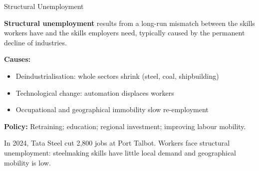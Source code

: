 \documentclass[16pt,aspectratio=169]{beamer}
\begin{document}
\begin{frame}{Structural Unemployment}
    \begin{definition}
        \textbf{Structural unemployment} results from a long-run mismatch between the skills workers have and the skills employers need, typically caused by the permanent decline of industries.
    \end{definition}

    \vspace{0.3em}
    \textbf{Causes:}
    \begin{itemize}
        \item Deindustrialisation: whole sectors shrink (steel, coal, shipbuilding)
        \item Technological change: automation displaces workers
        \item Occupational and geographical immobility slow re-employment
    \end{itemize}

    \vspace{0.2em}
    \textbf{Policy:} Retraining; education; regional investment; improving labour mobility.

    \vspace{0.2em}
    \begin{example}
        In 2024, Tata Steel cut 2,800 jobs at Port Talbot. Workers face structural unemployment: steelmaking skills have little local demand and geographical mobility is low.
    \end{example}
\end{frame}
\end{document}
